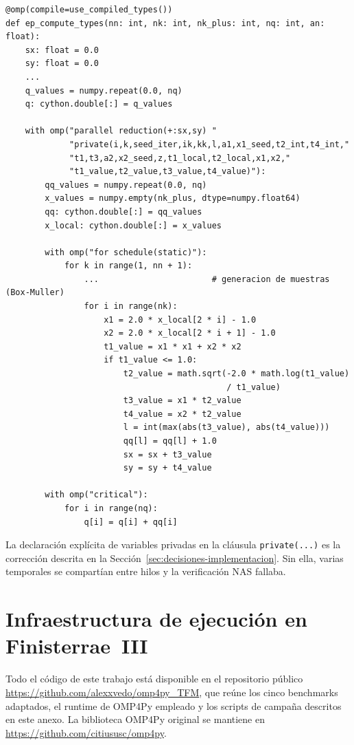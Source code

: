 \begin{verbatim}
@omp(compile=use_compiled_types())
def ep_compute_types(nn: int, nk: int, nk_plus: int, nq: int, an: float):
    sx: float = 0.0
    sy: float = 0.0
    ...
    q_values = numpy.repeat(0.0, nq)
    q: cython.double[:] = q_values

    with omp("parallel reduction(+:sx,sy) "
             "private(i,k,seed_iter,ik,kk,l,a1,x1_seed,t2_int,t4_int,"
             "t1,t3,a2,x2_seed,z,t1_local,t2_local,x1,x2,"
             "t1_value,t2_value,t3_value,t4_value)"):
        qq_values = numpy.repeat(0.0, nq)
        x_values = numpy.empty(nk_plus, dtype=numpy.float64)
        qq: cython.double[:] = qq_values
        x_local: cython.double[:] = x_values

        with omp("for schedule(static)"):
            for k in range(1, nn + 1):
                ...                       # generacion de muestras (Box-Muller)
                for i in range(nk):
                    x1 = 2.0 * x_local[2 * i] - 1.0
                    x2 = 2.0 * x_local[2 * i + 1] - 1.0
                    t1_value = x1 * x1 + x2 * x2
                    if t1_value <= 1.0:
                        t2_value = math.sqrt(-2.0 * math.log(t1_value)
                                             / t1_value)
                        t3_value = x1 * t2_value
                        t4_value = x2 * t2_value
                        l = int(max(abs(t3_value), abs(t4_value)))
                        qq[l] = qq[l] + 1.0
                        sx = sx + t3_value
                        sy = sy + t4_value

        with omp("critical"):
            for i in range(nq):
                q[i] = q[i] + qq[i]
\end{verbatim}

La declaración explícita de variables privadas en la cláusula
\texttt{private(...)} es la corrección descrita en la
Sección~\ref{sec:decisiones-implementacion}. Sin ella, varias temporales se
compartían entre hilos y la verificación NAS fallaba.


\chapter{Infraestructura de ejecución en Finisterrae~III}
\label{anexo:infraestructura}

Todo el código de este trabajo está disponible en el repositorio público
\url{https://github.com/alexxvedo/omp4py_TFM}, que reúne los cinco benchmarks
adaptados, el runtime de OMP4Py empleado y los scripts de campaña descritos en
este anexo. La biblioteca OMP4Py original se mantiene en
\url{https://github.com/citiususc/omp4py}.

